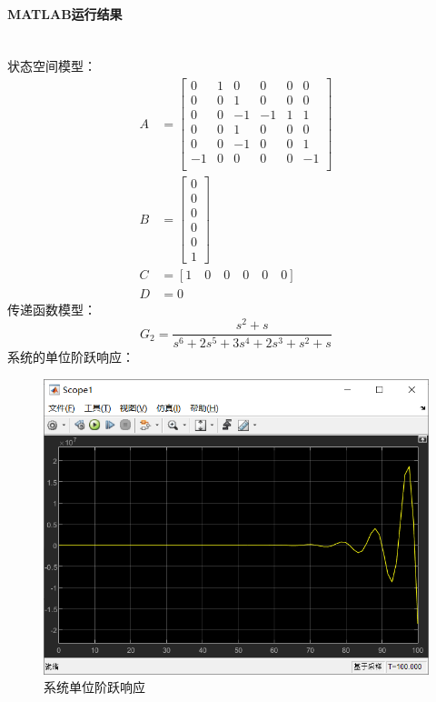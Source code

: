 \documentclass[UTF8]{article}
\begin{document}
\paragraph{MATLAB运行结果}~{}
\\
状态空间模型：
\begin{align*}
    A &= 
    \begin{bmatrix}
        0 & 1 & 0 & 0 & 0 & 0 \\
        0 & 0 & 1 & 0 & 0 & 0 \\
        0 & 0 & -1 & -1 & 1 & 1 \\
        0 & 0 & 1 & 0 & 0 & 0 \\
        0 & 0 & -1 & 0 & 0 & 1 \\
        -1 & 0 & 0 & 0 & 0 & -1 \\
    \end{bmatrix} \\
    B &= 
    \begin{bmatrix}
        0 \\
        0 \\
        0 \\
        0 \\
        0 \\
        1
    \end{bmatrix} \\
    C &= [1 \quad 0 \quad 0 \quad 0 \quad 0 \quad 0] \\
    D &= 0
\end{align*}
传递函数模型：
$$
    G_2 = \frac{s^2 + s}{s^6 + 2s^5 + 3s^4 + 2s^3 + s^2 + s}
$$
系统的单位阶跃响应：
\begin{figure}[H]
    \centering %
    \includegraphics[width=.8\textwidth]{figure/exp1_1_系统单位阶跃响应.png} 
    \caption{系统单位阶跃响应} %
\end{figure}
\end{document}
